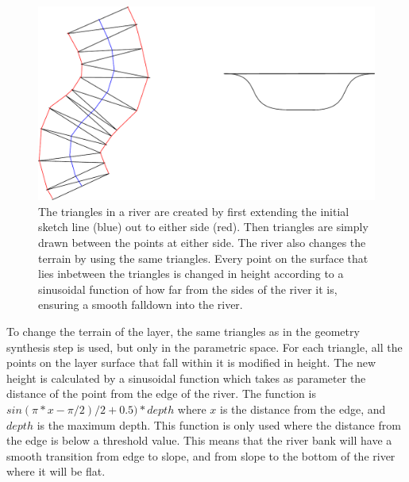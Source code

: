 \documentclass[a4paper,12pt]{report}
\begin{document}

\begin{figure}
\centering
\includegraphics[width=.7\linewidth]{thesis/riverTriangles.pdf}
 \caption{The triangles in a river are created by first extending the initial sketch line (blue) out to either side (red). Then triangles are simply drawn between the points at either side. The river also changes the terrain by using the same triangles. Every point on the surface that lies inbetween the triangles is changed in height according to a sinusoidal function of how far from the sides of the river it is, ensuring a smooth falldown into the river. }
 \label{fig:riverTriangles}
\end{figure}

To change the terrain of the layer, the same triangles as in the geometry synthesis step is used, but only in the parametric space. For each triangle, all the points on the layer surface that fall within it is modified in height. The new height is calculated by a sinusoidal function which takes as parameter the distance of the point from the edge of the river. The function is $sin(\pi*x - \pi/2) /2 + 0.5)*depth$ where $x$ is the distance from the edge, and $depth$ is the maximum depth. This function is only used where the distance from the edge is below a threshold value. This means that the river bank will have a smooth transition from edge to slope, and from slope to the bottom of the river where it will be flat.
\end{document}
